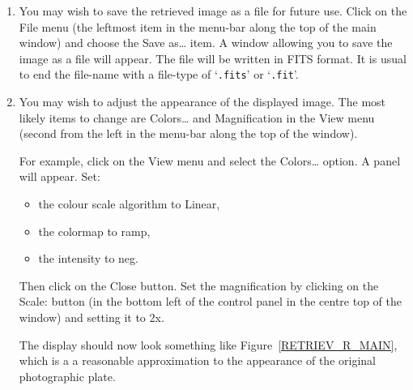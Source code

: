 \documentclass[twoside,11pt]{starlink}
\begin{document}
\begin{enumerate}
  \item You may wish to save the retrieved image as a file for future
   use.  Click on the \textsf{File} menu (the leftmost item in the menu-bar
   along the top of the main window) and choose the \textsf{Save as\ldots}
   item.  A window allowing you to save the image as a file will appear.
   The file will be written in FITS format.  It is usual to end the
   file-name with a file-type of `\texttt{.fits}' or `\texttt{.fit}'.

  \item You may wish to adjust the appearance of the displayed image.
   The most likely items to change are \textsf{Colors\ldots} and \textsf{Magnification} in the \textsf{View} menu (second from the left in the
   menu-bar along the top of the window).

   For example, click on the \textsf{View} menu and select the \textsf{Colors\ldots} option.  A panel will appear.  Set:

  \begin{itemize}

    \item the colour scale algorithm to \textsf{Linear},

    \item the colormap to \textsf{ramp},

    \item the intensity to \textsf{neg}.

  \end{itemize}

   Then click on the \textsf{Close} button.
   Set the magnification by clicking on the \textsf{Scale:} button (in the
   bottom left of the control panel in the centre top of the window) and
   setting it to \textsf{2x}.

   The display should now look something like Figure~\ref{RETRIEV_R_MAIN},
   which is a a reasonable approximation to the appearance of the
   original photographic plate.


\end{enumerate}
\end{document}
